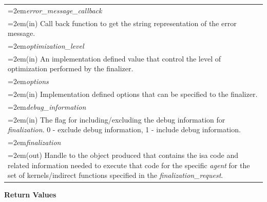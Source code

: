\documentclass[final]{book}
\newcommand{\hsaarg}[1]{\textit{#1}}
\begin{document}
\begin{longtable}{@{}>{\hangindent=2em}p{\textwidth}}
\hsaarg{error_\-message_\-callback}\\\hspace{2em}(in) Call back function to get the string representation of the error message.\\[2mm]
\hsaarg{optimization_\-level}\\\hspace{2em}(in) An implementation defined value that control the level of optimization performed by the finalizer.\\[2mm]
\hsaarg{options}\\\hspace{2em}(in) Implementation defined options that can be specified to the finalizer.\\[2mm]
\hsaarg{debug_\-information}\\\hspace{2em}(in) The flag for including/excluding the debug information for \textit{finalization}. 0 - exclude debug information, 1 - include debug information.\\[2mm]
\hsaarg{finalization}\\\hspace{2em}(out) Handle to the object produced that contains the isa code and related information needed to execute that code for the specific \textit{agent} for the set of kernels/indirect functions specified in the \textit{finalization_\-request}.
\end{longtable}
\vspace{-5mm}\noindent\textbf{Return Values}\\[-6mm]
\end{document}
